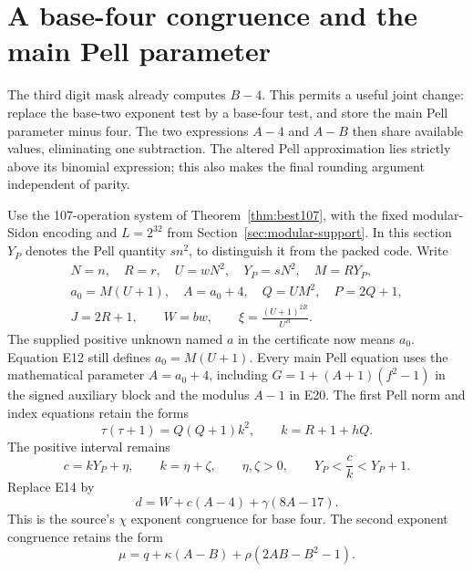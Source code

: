 \section{A base-four congruence and the main Pell parameter}
\label{sec:main-base-four}

The third digit mask already computes $B-4$. This permits a useful joint
change: replace the base-two exponent test by a base-four test, and store
the main Pell parameter minus four. The two expressions $A-4$ and $A-B$
then share available values, eliminating one subtraction. The altered
Pell approximation lies strictly above its binomial expression; this
also makes the final rounding argument independent of parity.

Use the 107-operation system of Theorem~\ref{thm:best107}, with the
fixed modular-Sidon encoding and $L=2^{32}$ from
Section~\ref{sec:modular-support}. In this section $Y_P$ denotes
the Pell quantity $s n^2$, to distinguish it from the packed code.
Write
\[
\begin{gathered}
 N=n,\quad R=r,\quad U=wN^2,\quad Y_P=sN^2,\quad M=RY_P,\\
 a_0=M(U+1),\quad A=a_0+4,\quad Q=UM^2,\quad P=2Q+1,\\
 J=2R+1,\qquad W=bw,\qquad \xi=\frac{(U+1)^{2R}}{U^R}.
\end{gathered}
\]
The supplied positive unknown named $a$ in the certificate now means
$a_0$. Equation E12 still defines $a_0=M(U+1)$. Every main Pell
equation uses the mathematical parameter $A=a_0+4$, including
$G=1+(A+1)(f^2-1)$ in the signed auxiliary block and the modulus
$A-1$ in E20. The first Pell norm and index equations retain the forms
\begin{equation}\label{eq:base-four-first-pell}
 \tau(\tau+1)=Q(Q+1)k^2,\qquad k=R+1+hQ.
\end{equation}
The positive interval remains
\begin{equation}\label{eq:base-four-interval}
 c=kY_P+\eta,\qquad k=\eta+\zeta,
 \qquad\eta,\zeta>0,
 \qquad Y_P<\frac ck<Y_P+1.
\end{equation}
Replace E14 by
\begin{equation}\label{eq:base-four-congruence}
 d=W+c(A-4)+\gamma(8A-17).
\end{equation}
This is the source's $\chi$ exponent congruence for base four.
The second exponent congruence retains the form
\begin{equation}\label{eq:base-four-second-congruence}
 \mu=q+\kappa(A-B)+\rho(2AB-B^2-1).
\end{equation}

